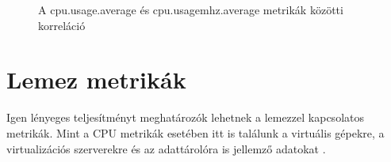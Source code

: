 \documentclass[a4paper,10pt,titlepage]{article}
\begin{document}
\begin{figure}[ht!]
  \centering
  \caption{A cpu.usage.average és cpu.usagemhz.average metrikák közötti korreláció}
  \label{fig:corrgram-hosts}
\end{figure}

\clearpage

\section{Lemez metrikák}

Igen lényeges teljesítményt meghatározók lehetnek a lemezzel kapcsolatos metrikák. Mint a CPU metrikák esetében itt is találunk a virtuális gépekre, a virtualizációs szerverekre és az adattárolóra is jellemző adatokat \cite{link:DC}.

\end{document}
